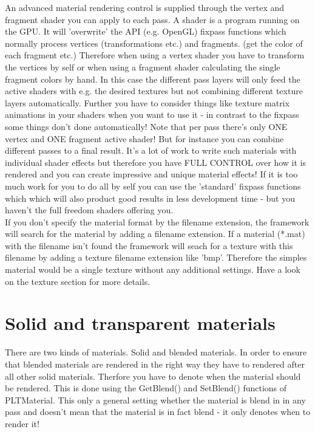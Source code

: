 An advanced material rendering control is supplied through the vertex and fragment shader you can apply
to each pass. A shader is a program running on the GPU. It will 'overwrite' the API (e.g. OpenGL)
fixpass functions which normally process vertices (transformations etc.) and fragments. (get the color
of each fragment etc.) Therefore when using a vertex shader you have to transform the vertices by self
or when using a fragment shader calculating the single fragment colors by hand. In this case the
different pass layers will only feed the active shaders with e.g. the desired textures but not combining
different texture layers automatically. Further you have to consider things like texture matrix animations
in your shaders when you want to use it - in contrast to the fixpass some things don't done automatically!
Note that per pass there's only ONE vertex and ONE fragment active shader! But for instance you can
combine different passes to a final result. It's a lot of work to write such materials with individual
shader effects but therefore you have FULL CONTROL over how it is rendered and you can create impressive
and unique material effects! If it is too much work for you to do all by self you can use the 'standard'
fixpass functions which which will also product good results in less development time - but you haven't
the full freedom shaders offering you.\\

If you don't specify the material format by the filename extension, the framework will search for the material
by adding a filename extension. If a material (*.mat) with the filename isn't found the framework will seach for a 
texture with this filename by adding a texture filename extension like 'bmp'. Therefore the simples
material would be a single texture without any additional settings. Have a look on the texture section
for more details.



\section{Solid and transparent materials}
There are two kinds of materials. Solid and blended materials. In order to ensure that blended
materials are rendered in the right way they have to rendered after all other solid materials.
Therfore you have to denote when the material should be rendered. This is done using the GetBlend()
and SetBlend() functions of PLTMaterial. This only a general setting whether the material is blend
in in any pass and doesn't mean that the material is in fact blend - it only denotes when to
render it!




